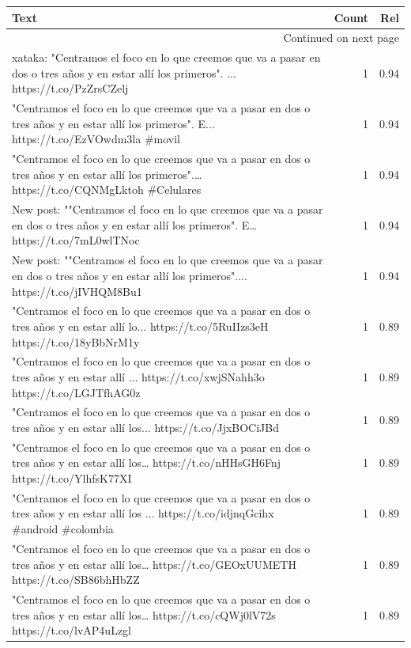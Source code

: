 \begin{longtable}{p{12.5cm}rr}
\toprule
Text & Count & Rel \\
\midrule
\endhead
\midrule
\multicolumn{3}{r}{{Continued on next page}} \\
\midrule
\endfoot

\bottomrule
\endlastfoot
xataka: "Centramos el foco en lo que creemos que va a pasar en dos o tres años y en estar allí los primeros". ... https://t.co/PzZrsCZelj & 1 & 0.94 \\
"Centramos el foco en lo que creemos que va a pasar en dos o tres años y en estar allí los primeros". E... https://t.co/EzVOwdm3la \#movil & 1 & 0.94 \\
"Centramos el foco en lo que creemos que va a pasar en dos o tres años y en estar allí los primeros".… https://t.co/CQNMgLktoh \#Celulares & 1 & 0.94 \\
New post: ""Centramos el foco en lo que creemos que va a pasar en dos o tres años y en estar allí los primeros". E… https://t.co/7mL0wlTNoc & 1 & 0.94 \\
New post: ""Centramos el foco en lo que creemos que va a pasar en dos o tres años y en estar allí los primeros".... https://t.co/jIVHQM8Bu1 & 1 & 0.94 \\
"Centramos el foco en lo que creemos que va a pasar en dos o tres años y en estar allí lo... https://t.co/5RuIIzs3eH https://t.co/18yBbNrM1y & 1 & 0.89 \\
"Centramos el foco en lo que creemos que va a pasar en dos o tres años y en estar allí ... https://t.co/xwjSNahh3o https://t.co/LGJTfhAG0z & 1 & 0.89 \\
"Centramos el foco en lo que creemos que va a pasar en dos o tres años y en estar allí los... https://t.co/JjxBOCiJBd & 1 & 0.89 \\
"Centramos el foco en lo que creemos que va a pasar en dos o tres años y en estar allí los… https://t.co/nHHsGH6Fnj https://t.co/YlhfsK77XI & 1 & 0.89 \\
"Centramos el foco en lo que creemos que va a pasar en dos o tres años y en estar allí los ... https://t.co/idjnqGcihx \#android \#colombia & 1 & 0.89 \\
"Centramos el foco en lo que creemos que va a pasar en dos o tres años y en estar allí los… https://t.co/GEOxUUMETH https://t.co/SB86bhHbZZ & 1 & 0.89 \\
"Centramos el foco en lo que creemos que va a pasar en dos o tres años y en estar allí los… https://t.co/cQWj0lV72s https://t.co/lvAP4uLzgl & 1 & 0.89 \\

\end{longtable}
